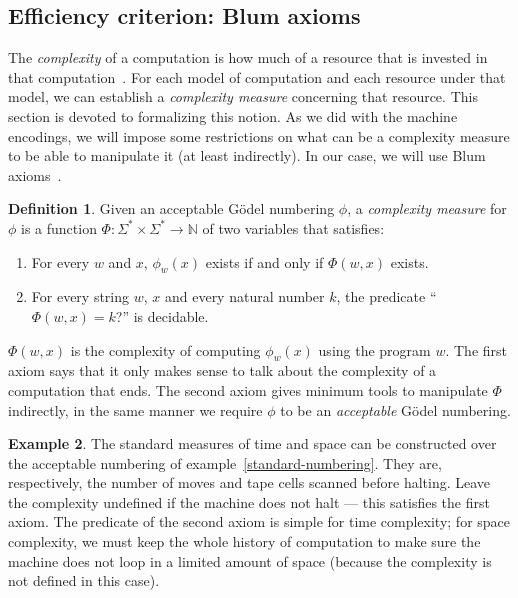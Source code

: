 \documentclass[12pt]{article}
\theoremstyle{definition}
\newtheorem{definition}{Definition}
\newtheorem{example}[definition]{Example}
\begin{document}
\subsection{Efficiency criterion: Blum axioms}
\label{sec:blum-axioms}

The \emph{complexity} of a computation is how much of a resource
that is invested in that computation~\cite[p.~285]{HopcroftUllman1979}.
For each model of computation and each resource under that model,
we can establish a \emph{complexity measure} concerning that resource.
This section is devoted to formalizing this notion.
As we did with the machine encodings,
we will impose some restrictions on what can be a complexity measure
to be able to manipulate it (at least indirectly).
In our case,
we will use Blum axioms~\cite[p.~324]{Blum1967}.

\begin{definition}
    Given an acceptable Gödel numbering $\phi$,
    a \emph{complexity measure} for $\phi$
    is a function $\Phi:\Sigma^* \times \Sigma^* \to \mathbb N$ of two variables
    that satisfies: \cite[p.~324]{Blum1967}
    \begin{enumerate}
        \item For every $w$ and $x$,
            $\phi_w(x)$ exists if and only if $\Phi(w, x)$ exists.
        \item For every string $w$, $x$ and every natural number $k$,
            the predicate ``$\Phi(w, x) = k$?'' is decidable.
    \end{enumerate}
\end{definition}

$\Phi(w, x)$ is the complexity of computing $\phi_w(x)$
using the program $w$.
The first axiom says that it only makes sense
to talk about the complexity of a computation that ends.
The second axiom gives minimum tools to manipulate $\Phi$ indirectly,
in the same manner we require $\phi$ to be an \emph{acceptable} Gödel numbering.

\begin{example}
    The standard measures of time and space can be constructed
    over the acceptable numbering of example~\ref{standard-numbering}.
    They are, respectively,
    the number of moves and tape cells scanned
    before halting.
    Leave the complexity undefined if the machine does not halt
    --- this satisfies the first axiom.
    The predicate of the second axiom is simple for time complexity;
    for space complexity,
    we must keep the whole history of computation
    to make sure the machine does not loop in a limited amount of space
    (because the complexity is not defined in this case).
\end{example}
\end{document}

